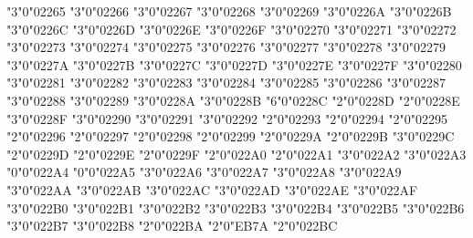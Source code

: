 \let\le\leq
\mchardef\geq"3"0"02265
\let\ge\geq
\mchardef\leqq"3"0"02266
\let\lid\leqq
\mchardef\geqq"3"0"02267
\let\gid\geqq
\mchardef\lneqq"3"0"02268
\mchardef\gneqq"3"0"02269
\mchardef\ll"3"0"0226A
\mchardef\gg"3"0"0226B
\mchardef\between"3"0"0226C
\mchardef\nasymp"3"0"0226D
\mchardef\nless"3"0"0226E
\mchardef\ngtr"3"0"0226F
\mchardef\nleq"3"0"02270
\mchardef\ngeq"3"0"02271
\mchardef\lesssim"3"0"02272
\let\la\lesssim
\mchardef\gtrsim"3"0"02273
\let\ga\gtrsim
\mchardef\nlesssim"3"0"02274
\mchardef\ngtrsim"3"0"02275
\mchardef\lessgtr"3"0"02276
\let\leogr\lessgtr
\mchardef\gtrless"3"0"02277
\let\grole\gtrless
\mchardef\nlessgtr"3"0"02278
\mchardef\ngtrless"3"0"02279
\mchardef\prec"3"0"0227A
\mchardef\succ"3"0"0227B
\mchardef\preccurlyeq"3"0"0227C
\mchardef\succcurlyeq"3"0"0227D
\mchardef\precsim"3"0"0227E
\mchardef\succsim"3"0"0227F
\mchardef\nprec"3"0"02280
\mchardef\nsucc"3"0"02281
\mchardef\subset"3"0"02282
\mchardef\supset"3"0"02283
\mchardef\nsubset"3"0"02284
\mchardef\nsupset"3"0"02285
\mchardef\subseteq"3"0"02286
\mchardef\supseteq"3"0"02287
\mchardef\nsubseteq"3"0"02288
\mchardef\nsupseteq"3"0"02289
\mchardef\subsetneq"3"0"0228A
\mchardef\supsetneq"3"0"0228B
\mchardef\cupleftarrow"6"0"0228C
\mchardef\cupdot"2"0"0228D
\mchardef\uplus"2"0"0228E
\mchardef\sqsubset"3"0"0228F
\mchardef\sqsupset"3"0"02290
\mchardef\sqsubseteq"3"0"02291
\mchardef\sqsupseteq"3"0"02292
\mchardef\sqcap"2"0"02293
\mchardef\sqcup"2"0"02294
\mchardef\oplus"2"0"02295
\mchardef\ominus"2"0"02296
\mchardef\otimes"2"0"02297
\mchardef\oslash"2"0"02298
\mchardef\odot"2"0"02299
\mchardef\circledcirc"2"0"0229A
\mchardef\circledast"2"0"0229B
\let\circast\circledast
\mchardef\circledequal"3"0"0229C
\mchardef\circleddash"2"0"0229D
\mchardef\boxplus"2"0"0229E
\mchardef\boxminus"2"0"0229F
\mchardef\boxtimes"2"0"022A0
\mchardef\boxdot"2"0"022A1
\let\squaredot\boxdot
\mchardef\vdash"3"0"022A2
\mchardef\dashv"3"0"022A3
\mchardef\top"0"0"022A4
\mchardef\bot"0"0"022A5
\mchardef\assert"3"0"022A6
\mchardef\models"3"0"022A7
\mchardef\vDash"3"0"022A8
\let\models\vDash
\mchardef\Vdash"3"0"022A9
\mchardef\Vvdash"3"0"022AA
\mchardef\VDash"3"0"022AB
\mchardef\nvdash"3"0"022AC
\mchardef\nvDash"3"0"022AD
\mchardef\nVdash"3"0"022AE
\mchardef\nVDash"3"0"022AF
\mchardef\prurel"3"0"022B0
\mchardef\scurel"3"0"022B1
\mchardef\vartriangleleft"3"0"022B2
\mchardef\vartriangleright"3"0"022B3
\mchardef\trianglelefteq"3"0"022B4
\mchardef\trianglerighteq"3"0"022B5
\mchardef\origof"3"0"022B6
\mchardef\imageof"3"0"022B7
\mchardef\multimap"3"0"022B8
\mchardef\intercal"2"0"022BA
\mchardef\veebar"2"0"EB7A
\mchardef\barwedge"2"0"022BC
